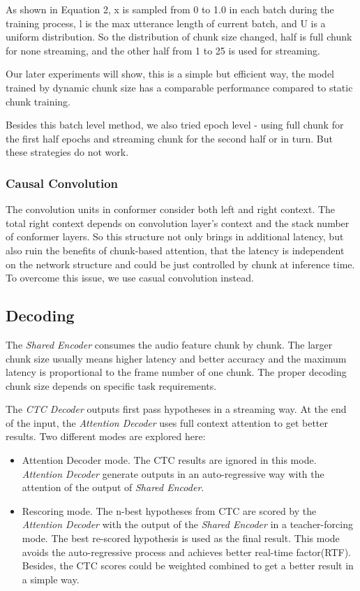 \documentclass[a4paper]{article}
\begin{document}
As shown in Equation 2, x is sampled from 0 to 1.0 in each batch during the training process, l is the max utterance length of current batch, and U is a uniform distribution. So the distribution of chunk size changed, half is full chunk for none streaming, and the other half from 1 to 25 is used for streaming. 

Our later experiments will show, this is a simple but efficient way, the model trained by dynamic chunk size has a comparable performance compared to static chunk training.

Besides this batch level method, we also tried epoch level - using full chunk for the first half epochs and streaming chunk for the second half or in turn. But these strategies do not work.

\subsubsection{Causal Convolution}

The convolution units in conformer consider both left and right context. The total right context depends on  convolution layer's context and the stack number of conformer layers. So this structure not only brings in  additional latency, but also ruin the benefits of chunk-based attention, that the latency is independent on the network structure and could be just controlled by chunk at inference time. To overcome this issue, we use casual convolution\cite{tripathi2020transformer} instead.

\subsection{Decoding}

The \textit{Shared Encoder} consumes the audio feature chunk by chunk. The larger chunk size usually means higher latency and better accuracy and the maximum latency is proportional to the frame number of one chunk. The proper decoding chunk size depends on specific task requirements.

The \textit{CTC Decoder}  outputs first pass hypotheses in a streaming way. At the end of the input, the \textit{Attention Decoder} uses full context attention to get better results. Two different modes are explored here:
\begin{itemize}
\item Attention Decoder mode. The CTC results are ignored in this mode. \textit{Attention Decoder} generate outputs in an auto-regressive way with the attention of the output of \textit{Shared Encoder}. 

\item Rescoring mode. The n-best hypotheses from CTC are scored by the \textit{Attention Decoder} with the output of the \textit{Shared Encoder} in a teacher-forcing mode. The best re-scored hypothesis is used as the final result. This mode avoids the auto-regressive process and achieves better real-time factor(RTF). Besides, the CTC scores could be weighted combined to get a better result in a simple way. 
\end{itemize}
\end{document}
